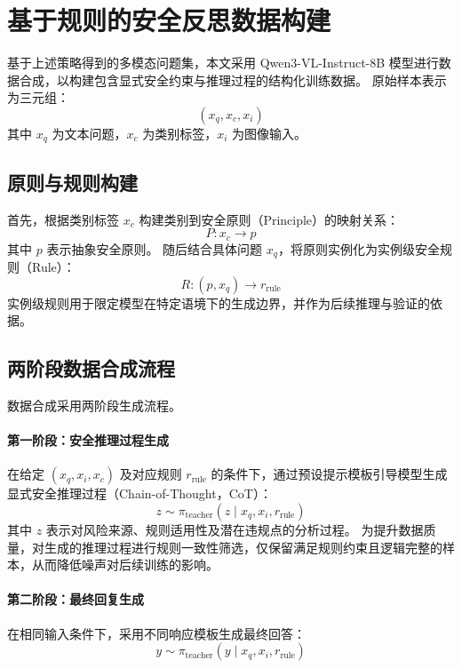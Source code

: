 \section{基于规则的安全反思数据构建}
基于上述策略得到的多模态问题集，本文采用 Qwen3-VL-Instruct-8B 模型进行数据合成，以构建包含显式安全约束与推理过程的结构化训练数据。
原始样本表示为三元组：
\begin{equation}
(x_q, x_c, x_i)
\end{equation}
其中 $x_q$ 为文本问题，$x_c$ 为类别标签，$x_i$ 为图像输入。
\subsection{原则与规则构建}
首先，根据类别标签 $x_c$ 构建类别到安全原则（Principle）的映射关系：
\begin{equation}
P: x_c \rightarrow p
\end{equation}
其中 $p$ 表示抽象安全原则。
随后结合具体问题 $x_q$，将原则实例化为实例级安全规则（Rule）：
\begin{equation}
R: (p, x_q) \rightarrow r_{\mathrm{rule}}
\end{equation}
实例级规则用于限定模型在特定语境下的生成边界，并作为后续推理与验证的依据。

\subsection{两阶段数据合成流程}

数据合成采用两阶段生成流程。
\paragraph{第一阶段：安全推理过程生成}
在给定 $(x_q, x_i, x_c)$ 及对应规则 $r_{\mathrm{rule}}$ 的条件下，通过预设提示模板引导模型生成显式安全推理过程（Chain-of-Thought，CoT）：
\begin{equation}
z \sim \pi_{\mathrm{teacher}}(z \mid x_q, x_i, r_{\mathrm{rule}})
\end{equation}
其中 $z$ 表示对风险来源、规则适用性及潜在违规点的分析过程。
为提升数据质量，对生成的推理过程进行规则一致性筛选，仅保留满足规则约束且逻辑完整的样本，从而降低噪声对后续训练的影响。

\paragraph{第二阶段：最终回复生成}
在相同输入条件下，采用不同响应模板生成最终回答：
\begin{equation}
y \sim \pi_{\mathrm{teacher}}(y \mid x_q, x_i, r_{\mathrm{rule}})
\end{equation}

